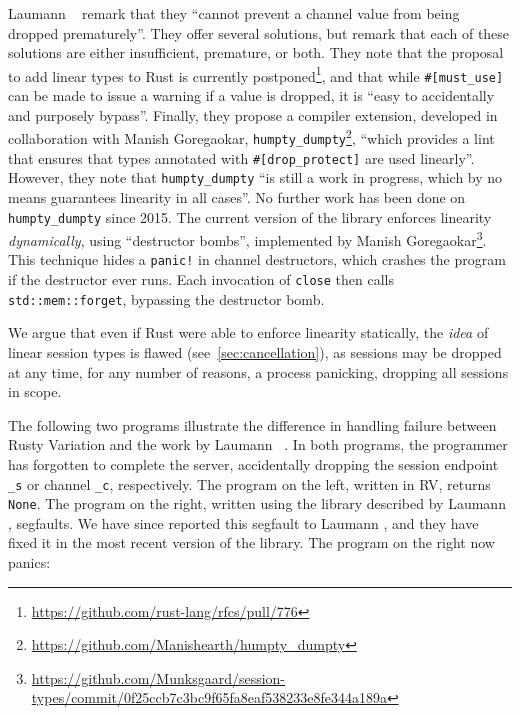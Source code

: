 \documentclass[copyright,creativecommons]{eptcs}
\begin{document}
Laumann \etal~\cite{jespersen2015} remark that they ``cannot prevent a channel value from being dropped prematurely''. They offer several solutions, but remark that each of these solutions are either insufficient, premature, or both. They note that the proposal to add linear types to Rust is currently postponed\footnote{\url{https://github.com/rust-lang/rfcs/pull/776}}, and that while \lstinline{#[must_use]} can be made to issue a warning if a value is dropped, it is ``easy to accidentally and purposely bypass''. Finally, they propose a compiler extension, developed in collaboration with Manish Goregaokar, \lstinline{humpty_dumpty}\footnote{\url{https://github.com/Manishearth/humpty_dumpty}}, ``which provides a lint that ensures that types annotated  with \lstinline{#[drop_protect]} are used linearly''. However, they note that \lstinline{humpty_dumpty} ``is still a work in progress, which by no means guarantees linearity in all cases''. No further work has been done on \lstinline{humpty_dumpty} since 2015. The current version of the library enforces linearity \emph{dynamically}, using ``destructor bombs'', implemented by Manish Goregaokar\footnote{\url{https://github.com/Munksgaard/session-types/commit/0f25ccb7c3bc9f65fa8eaf538233e8fe344a189a}}. This technique hides a \lstinline{panic!} in channel destructors, which crashes the program if the destructor ever runs. Each invocation of \lstinline{close} then calls \lstinline{std::mem::forget}, bypassing the destructor bomb.

We argue that even if Rust were able to enforce linearity statically, the \emph{idea} of linear session types is flawed (see~\cref{sec:cancellation}), as sessions may be dropped at any time, for any number of reasons, \eg a process panicking, dropping all sessions in scope.

The following two programs illustrate the difference in handling failure between Rusty Variation and the work by Laumann \etal~\cite{jespersen2015}. In both programs, the programmer has forgotten to complete the server, accidentally dropping the session endpoint \lstinline{_s} or channel \lstinline{_c}, respectively. The program on the left, written in RV, returns \lstinline{None}. The program on the right, written using the library described by Laumann \etal\cite{jespersen2015}, segfaults. We have since reported this segfault to Laumann \etal, and they have fixed it in the most recent version of the library. The program on the right now panics:
\end{document}
